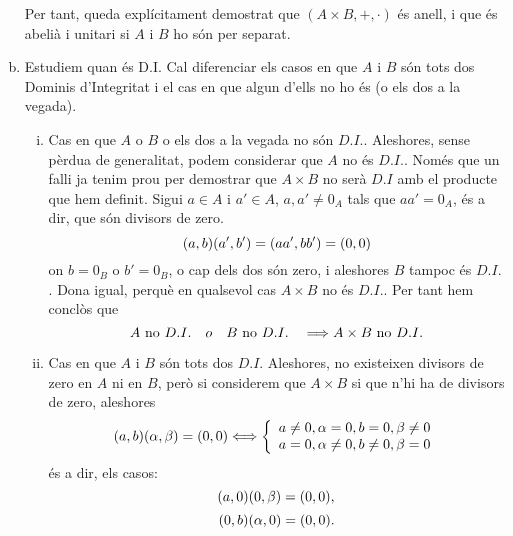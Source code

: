 \documentclass[../main.tex]{subfiles}
\begin{document}
\begin{sol}
\begin{enumerate}[(a)]
    Per tant, queda explícitament demostrat que $(A\times B,+,\cdotp)$ és anell, i que és abelià i unitari si $A$ i $B$ ho són per separat.
    
    \item Estudiem quan és D.I. Cal diferenciar els casos en que $A$ i $B$ són tots dos Dominis d'Integritat i el cas en que algun d'ells no ho és (o els dos a la vegada).
    \begin{enumerate}[(i)]
        \item Cas en que $A$ o $B$ o els dos a la vegada no són $D.I.$. Aleshores, sense pèrdua de generalitat, podem considerar que $A$ no és $D.I.$. Només que un falli ja tenim prou per demostrar que $A\times B$ no serà $D.I$ amb el producte que hem definit. Sigui $a\in A$ i $a'\in A$, $a,a'\not=0_A$ tals que $aa'=0_A$, és a dir, que són divisors de zero.
        \begin{equation}
            \notag
            (a,b)(a',b') = (aa',bb')=(0,0)
        \end{equation}
        on $b=0_B$ o $b'=0_B$, o cap dels dos són zero, i aleshores $B$ tampoc és $D.I.$. Dona igual, perquè en qualsevol cas $A\times B$ no és $D.I.$. Per tant hem conclòs que 
        \begin{equation}
            \notag
            A\text{ no } D.I. \quad o \quad B\text{ no }D.I. \quad \Longrightarrow A\times B \text{ no } D.I.
        \end{equation}
        
        \item Cas en que $A$ i $B$ són tots dos $D.I.$ Aleshores, no existeixen divisors de zero en $A$ ni en $B$, però si considerem que $A\times B$ si que n'hi ha de divisors de zero, aleshores
        \begin{equation}
            \notag
            (a,b)(\alpha,\beta)=(0,0) \Longleftrightarrow 
            \left\{
            \begin{array}{ll}
                 a \not= 0, \alpha=0, b=0,\beta\not=0 \\
                 a=0,\alpha \not=0, b\not=0,\beta=0
            \end{array}
            \right.
        \end{equation}
        és a dir, els casos:
        \begin{equation}
            \notag
            (a,0)(0,\beta)=(0,0),
        \end{equation}
        \begin{equation}
            \notag
            (0,b)(\alpha,0)=(0,0).
        \end{equation}
        

\end{enumerate}
\end{enumerate}
\end{sol}
\end{document}
